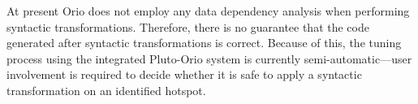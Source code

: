 At present Orio does not employ any data dependency analysis when performing
syntactic transformations. Therefore, there is no guarantee that the code
generated after syntactic transformations is correct. Because of this, the
tuning process using the integrated Pluto-Orio system is currently
semi-automatic---user involvement is required to decide whether it is safe
to apply a syntactic transformation on an identified hotspot.



